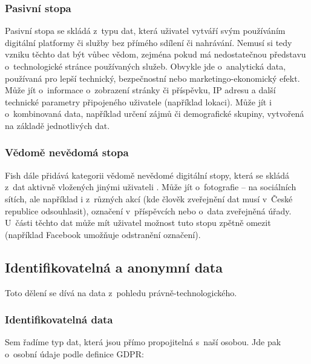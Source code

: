 \subsubsection*{Pasivní stopa}

Pasivní stopa se skládá z~typu dat, která uživatel vytváří svým používáním digitální platformy či služby bez přímého sdílení či nahrávání. Nemusí si tedy vzniku těchto dat být vůbec vědom, zejména pokud má nedostatečnou představu o~technologické stránce používaných služeb. Obvykle jde o~analytická data, používaná pro lepší technický, bezpečnostní nebo marketingo-ekonomický efekt. Může jít o~informace o~zobrazení stránky či příspěvku, IP adresu a další technické parametry připojeného uživatele (například lokaci). Může jít i o~kombinovaná data, například určení zájmů či demografické skupiny, vytvořená na základě jednotlivých dat.

\subsubsection*{Vědomě nevědomá stopa}

Fish dále přidává kategorii vědomě nevědomé digitální stopy, která se skládá z~dat aktivně vložených jinými uživateli \citep{fish-digital-footprint}.
Může jít o~fotografie -- na sociálních sítích, ale například i z~různých akcí (kde člověk zveřejnění dat musí v~České republice odsouhlasit), označení v~příspěvcích nebo o~data zveřejněná úřady. U~části těchto dat může mít uživatel možnost tuto stopu zpětně omezit (například Facebook umožňuje odstranění označení).

\subsection{Identifikovatelná a anonymní data}
Toto dělení se dívá na data z~pohledu právně-technologického.

\subsubsection*{Identifikovatelná data}

Sem řadíme typ dat, která jsou přímo propojitelná s~naší osobou. Jde pak o~osobní údaje podle definice GDPR:

\begin{displayquote}
	\citep{gdpr}
\end{displayquote}


